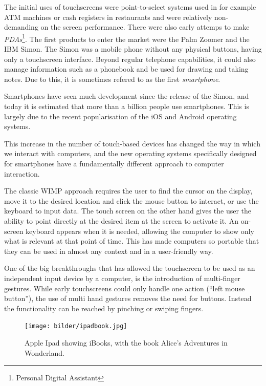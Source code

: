 The initial uses of touchscreens were point-to-select systems used in for example ATM machines or cash registers in restaurants and were relatively non-demanding on the screen performance\cite{buxton}. There were also early attemps to make \emph{PDAs}\footnote{Personal Digital Assistant}. The first products to enter the market were the Palm Zoomer and the IBM Simon. The Simon was a mobile phone without any physical buttons, having only a touchscreen interface. Beyond regular telephone capabilities, it could also manage information such as a phonebook and be used for drawing and taking notes. Due to this, it is sometimes refered to as the first \emph{smartphone}\cite{buxton}.

Smartphones have seen much development since the release of the Simon, and today it is estimated that more than a billion people use smartphones\cite{billion1}\cite{billion2}. This is largely due to the recent popularisation of the iOS and Android operating systems.

This increase in the number of touch-based devices has changed the way in which we interact with computers, and the new operating systems specifically designed for smartphones have a fundamentally different approach to computer interaction.

The classic WIMP approach requires the user to find the cursor on the display, move it to the desired location and click the mouse button to interact, or use the keyboard to input data. The touch screen on the other hand gives the user the ability to point directly at the desired item at the screen to activate it. An on-screen keyboard appears when it is needed, allowing the computer to show only what is relevant at that point of time. This has made computers so portable that they can be used in almost any context and in a user-friendly way.

One of the big breakthroughs that has allowed the touchscreen to be used as an independent input device by a computer, is the introduction of multi-finger gestures. While early touchscreens could only handle one action (``left mouse button''), the use of multi hand gestures removes the need for buttons. Instead the functionality can be reached by pinching or swiping fingers.

\begin{figure}[]
\texttt{[image: bilder/ipadbook.jpg]}
\caption{Apple Ipad showing iBooks, with the book Alice's Adventures in Wonderland.}
\label{ibooks}
\end{figure}
\nocite{ipadbook}

